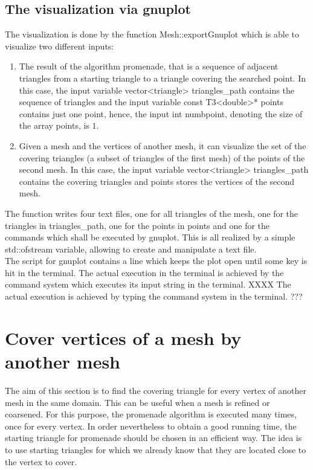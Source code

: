 \documentclass[10pt]{article}
\begin{document}
\subsection{The visualization via gnuplot} \label{visualization}
	The visualization is done by the function {\ttfamily Mesh::exportGnuplot} which is able to visualize two different inputs: 
	\begin{enumerate}
		\item 
		The result of the algorithm promenade, that is a sequence of adjacent triangles from a starting triangle to a triangle covering the searched point. 
		In this case, the input variable {\ttfamily vector<triangle> triangles\_path} contains the sequence of triangles and the input variable {\ttfamily const T3<double>* points} contains just one point, hence, the input {\ttfamily int numbpoint}, denoting the size of the array {\ttfamily points}, is $ 1 $. 
		\item 
		Given a mesh and the vertices of another mesh, it can visualize the set of the covering triangles (a subset of triangles of the first mesh) of the points of the second mesh. 
		In this case, the input variable {\ttfamily vector<triangle> triangles\_path} contains the covering triangles and {\ttfamily points} stores the vertices of the second mesh. 
	\end{enumerate}
The function writes four text files, one for all triangles of the mesh, one for the triangles in {\ttfamily triangles\_path}, one for the points in {\ttfamily points} and one for the commands which shall be executed by gnuplot. This is all realized by a simple {\ttfamily std::ofstream} variable, allowing to create and manipulate a text file. \\
The script for gnuplot contains a line which keeps the plot open until some key is hit in the terminal. 
The actual execution in the terminal is achieved by the command {\ttfamily system} which executes its input string in the terminal. XXXX The actual execution is achieved by typing the command {\ttfamily system} in the terminal. ???

\section{Cover vertices of a mesh by another mesh}

The aim of this section is to find the covering triangle for every vertex of another mesh in the same domain. This can be useful when a mesh is refined or coarsened. For this purpose, the promenade algorithm is executed many times, once for every vertex. In order nevertheless to obtain a good running time, the starting triangle for {\ttfamily promenade} should be chosen in an efficient way. The idea is to use starting triangles for which we already know that they are located close to the vertex to cover.
\end{document}
